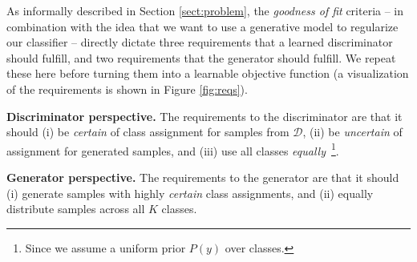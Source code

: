 \documentclass{article} \usepackage{iclr2016_conference,times}
\begin{document}
As informally described in Section \ref{sect:problem}, the
\emph{goodness of fit} criteria -- in combination 
with the idea that we want to use a generative model to regularize our
classifier -- directly dictate three requirements that a learned
discriminator should fulfill, and two requirements that the generator
should fulfill. We repeat these here before turning them into a
learnable objective function (a visualization of the requirements is shown
in Figure \ref{fig:reqs}). 

\textbf{Discriminator perspective.} The requirements to the
discriminator are that it should (i) be \emph{certain} of class
assignment for samples from $\mathcal{D}$, (ii) be \emph{uncertain} of
assignment for generated samples, and (iii) use all classes 
\emph{equally}~\footnote{Since we assume a uniform prior $P(y)$
  over classes.}.

\textbf{Generator perspective.} The requirements to the
generator are that it should (i) generate samples with highly
\emph{certain} class assignments, and (ii) equally distribute samples
across all $K$ classes.
\end{document}
